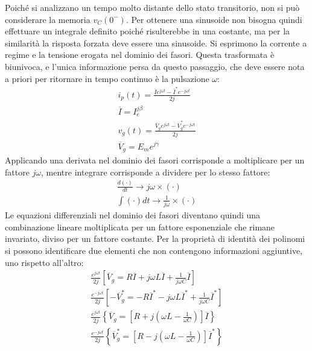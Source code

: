\documentclass{article}
\numberwithin{equation}{subsection}
\begin{document}
Poiché si analizzano un tempo molto distante dello stato transitorio, non si può considerare la memoria $v_C(0^-)$. Per ottenere una sinusoide non bisogna quindi effettuare 
un integrale definito poiché risulterebbe in una costante, ma per la similarità la risposta forzata deve essere una sinusoide. 
Si esprimono la corrente a regime e la tensione erogata nel dominio dei fasori. Questa trasformata è biunivoca, e l'unica informazione persa da questo passaggio, che deve 
essere nota a priori per ritornare in tempo continuo è la pulsazione $\omega$:
\begin{gather*}
    i_p(t)=\displaystyle\frac{\overline{I}e^{j\omega t}-\overline{I}^*e^{-j\omega t}}{2j}\\
    \overline{I}=I_e^{j\beta}\\
    v_{g}(t)=\displaystyle\frac{\overline{V}_ge^{j\omega t}-\overline{V}_g^*e^{-j\omega t}}{2j}\\
    \overline{V}_g=E_me^{j\gamma}
\end{gather*}
Applicando una derivata nel dominio dei fasori corrisponde a moltiplicare per un fattore $j\omega$, mentre integrare corrisponde a dividere per lo stesso 
fattore:
\begin{gather*}
    \displaystyle\frac{d(\cdot)}{dt}\to j\omega\times(\cdot)\\
    \displaystyle\int (\cdot)dt\to\displaystyle\frac{1}{j\omega}\times(\cdot)
\end{gather*}
Le equazioni differenziali nel dominio dei fasori diventano quindi una combinazione lineare moltiplicata per un fattore esponenziale che rimane invariato, diviso per un 
fattore costante. Per la proprietà di identità dei polinomi si possono identificare due elementi che non contengono informazioni aggiuntive, uno rispetto all'altro: 
\begin{gather*}
    \displaystyle\frac{e^{j\omega t}}{2j}\left[\overline{V}_g=R\overline{I}+j\omega L\overline{I}+\frac{1}{j\omega C}\overline{I}\right]\\
    \displaystyle\frac{e^{-j\omega t}}{2j}\left[-\overline{V}_g^*=-R\overline{I}^*-j\omega L\overline{I}^*+\frac{1}{j\omega C}\overline{I}^*\right]\\
    \displaystyle\frac{e^{j\omega t}}{2j}\left\{\overline{V}_g=\left[R+j\left(\omega L-\frac{1}{\omega C}\right)\right]\overline{I}\right\}\\
    \displaystyle\frac{e^{-j\omega t}}{2j}\left\{\overline{V}_g^*=\left[R-j\left(\omega L-\frac{1}{\omega C}\right)\right]\overline{I}^*\right\}
\end{gather*}
\end{document}
